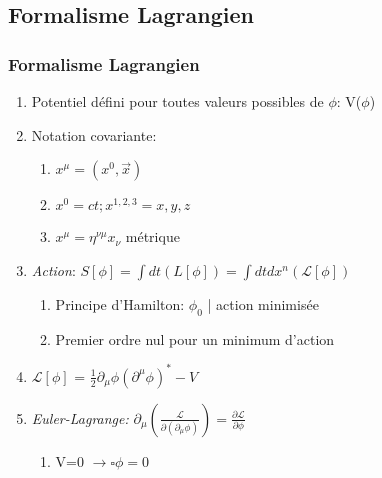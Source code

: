 \documentclass[handout]{beamer}
\begin{document}
\subsection{Formalisme Lagrangien}
\begin{frame}
\frametitle{Formalisme Lagrangien}
\begin{enumerate}
\item Potentiel défini pour toutes valeurs possibles de $\phi$: V($\phi$) \\
\item Notation covariante:
\begin{enumerate}
\item $x^\mu = (x^0,\vec{x})$
\item $x^0 = ct ; x^{1,2,3} = x,y,z$
\item $x^\mu = \eta^{\nu\mu} x_\nu$ métrique
\end{enumerate}
\item \textit{Action}: $S[\phi] = \int{dt (L[\phi])} = \int{dt dx^n (\mathcal{L}[\phi])}$ \\
\begin{enumerate}
\item Principe d'Hamilton: $\phi_0$ | action minimisée \\
\item Premier ordre nul pour un minimum d'action \\
\end{enumerate}
\item  $\mathcal{L}[\phi]$ = $\frac{1}{2} \partial_\mu \phi (\partial^\mu \phi)^* -V$\\
\item \textit{Euler-Lagrange:} $\partial_\mu \left(\frac{\mathcal{L}}{\partial(\partial_\mu\phi)}\right) = \frac{\partial\mathcal{L}}{\partial\phi}$
\begin{enumerate}
\item V=0 $\rightarrow \square\phi=0$
\end{enumerate}
\end{enumerate}
\end{frame}
\end{document}
